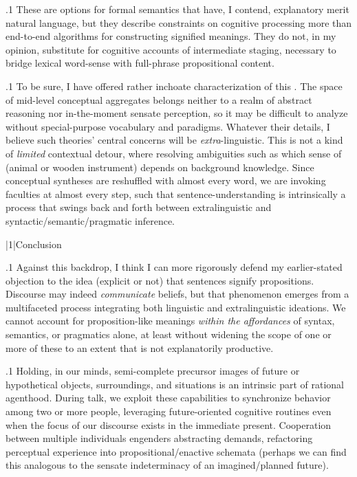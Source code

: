 \documentclass[11pt, twocolumn]{article}
\begin{document}
\p.1{%
\:\+These are options for formal semantics that have, I contend,
explanatory merit \visavis{} natural language, but they describe
constraints on cognitive processing more than end-to-end
algorithms for constructing signified 
meanings. \> They do not, in my opinion, substitute for cognitive
accounts of intermediate staging, necessary
to bridge lexical word-sense with full-phrase 
propositional content.\<\;
} %

\p.1{%
\:\+To be sure, I have offered rather inchoate characterization
of this . \> The space of mid-level conceptual
aggregates belongs neither to a realm of abstract reasoning nor
in-the-moment sensate perception, so it may be difficult to
analyze without special-purpose vocabulary and 
paradigms. \> Whatever their details, I believe such theories' central
concerns will be \textit{extra}-linguistic. \> This is not a kind
of \textit{limited} contextual detour, where resolving
ambiguities such as which sense of  (animal or wooden instrument) depends on
background knowledge. \> Since conceptual syntheses are
reshuffled with almost every word, we are
invoking  faculties at almost every
step, such that sentence-understanding is intrinsically a
process that swings back and forth between
extralinguistic and syntactic/semantic/pragmatic
inference.\<\; \vspace{4pt} \enlargethispage{5pt}
} %


\s|1|{Conclusion}

\p.1{%
\:\+Against this backdrop, I think I can more rigorously
defend my earlier-stated objection to the
idea (explicit or not) that sentences signify 
propositions. \> Discourse may indeed \textit{communicate} beliefs,
but that phenomenon emerges from a multifaceted
process integrating both linguistic and extralinguistic
ideations. \> We cannot account for proposition-like
meanings \textit{within the affordances} of syntax, semantics,
or pragmatics alone, at least without widening the scope
of one or more of these to an extent that is not explanatorily
productive.\<\;
} %

\p.1{%
\:\+Holding, in our minds, semi-complete precursor images of
future or hypothetical objects, surroundings, and
situations is an intrinsic part of rational 
agenthood. \> During talk, we exploit these capabilities
to synchronize behavior among two or more people,
leveraging future-oriented cognitive routines even
when the focus of our discourse exists in the immediate
present. \> Cooperation between multiple individuals engenders
abstracting demands, refactoring perceptual experience
into propositional/enactive schemata (perhaps we can find this
analogous to the sensate indeterminacy
of an imagined/planned future).\<\;
} %
\end{document}
